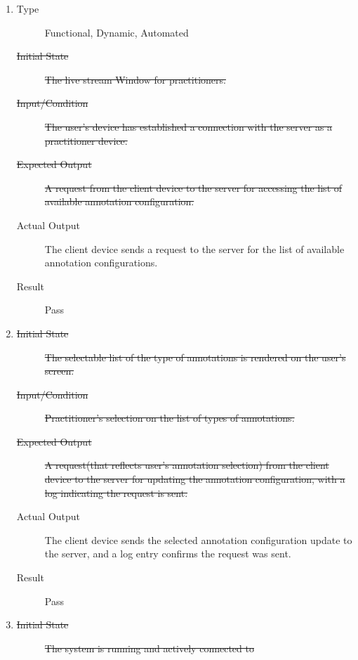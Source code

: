 \documentclass[12pt, titlepage]{article}
\begin{document}
\begin{enumerate}[FR-T1]
  \item \label{FRT4}
    \begin{description}
    \item[Type] Functional, Dynamic, Automated
    \item[\sout{Initial State}]\sout{ The live stream Window for practitioners.
    }\item[\sout{Input/Condition}]\sout{ The user’s device has established a connection with the
      server as a practitioner device.
    }\item[\sout{Expected Output}]\sout{ A request from the client device to the server for
      accessing the list of available annotation configuration.
    }\item[Actual Output] The client device sends a request to the server for the
      list of available annotation configurations.
    \item[Result] Pass
    \end{description}
  \item \label{FRT5}
    \begin{description}
    \item[\sout{Initial State}]\sout{ The selectable list of the type of annotations is
      rendered on the user's screen.
    }\item[\sout{Input/Condition}]\sout{ Practitioner’s selection on the list of types of
      annotations.
    }\item[\sout{Expected Output}]\sout{ A request(that reflects user’s annotation selection)
      from the client device to the server for updating the annotation
      configuration, with a log indicating the request is sent.
    }\item[Actual Output] The client device sends the selected annotation
      configuration update to the server, and a log entry confirms the request
      was sent.
    \item[Result] Pass
    \end{description}
  \item \label{FRT6}
    \begin{description}
    \item[\sout{Initial State}]\sout{ The system is running and actively connected to
}
\end{description}
\end{enumerate}
\end{document}
